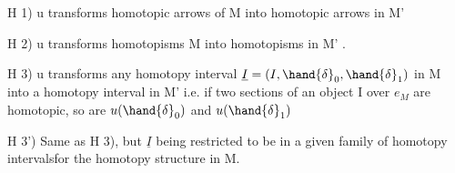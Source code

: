 H 1)  u transforms homotopic arrows of M into homotopic arrows in M'

H 2)  u transforms homotopisms  M into homotopisms in M' .

H 3)  u transforms any homotopy interval $\underline{I} = (I,\hand{\delta}_0,\hand{\delta}_1)$ in M into a
homotopy interval in M' \hand{(} i.e. if two sections of an object
I over $e_M$ are homotopic, so are $u(\hand{\delta}_0)$ and $u(\hand{\delta}_1)$

H 3')  Same as H 3), but $\underline{I}$ being restricted\hand{,} to be in a given %
 family of homotopy intervals\hand{,}for the homotopy 
structure in M.

